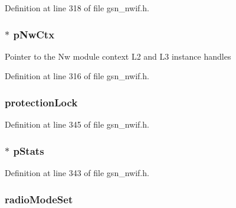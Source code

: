 Definition at line 318 of file gsn\_\-nwif.h.

\hypertarget{a00167_a4ab8e1b7273bd13fb04f9726ebf1d430}{
\subsubsection[{pNwCtx}]{$\ast$ {\bf pNwCtx}}}
\label{a00167_a4ab8e1b7273bd13fb04f9726ebf1d430}
Pointer to the Nw module context L2 and L3 instance handles 

Definition at line 316 of file gsn\_\-nwif.h.

\hypertarget{a00167_afb7d19983a90716b80a2f4dbfbf7b0c8}{
\subsubsection[{protectionLock}]{ {\bf protectionLock}}}
\label{a00167_afb7d19983a90716b80a2f4dbfbf7b0c8}


Definition at line 345 of file gsn\_\-nwif.h.

\hypertarget{a00167_aec0dbb062c1551edeb82d3a45c451e01}{
\subsubsection[{pStats}]{$\ast$ {\bf pStats}}}
\label{a00167_aec0dbb062c1551edeb82d3a45c451e01}


Definition at line 343 of file gsn\_\-nwif.h.

\hypertarget{a00167_a7e70681c41285d86fbe97d5ca157c9d1}{
\subsubsection[{radioModeSet}]{ {\bf radioModeSet}}}
\label{a00167_a7e70681c41285d86fbe97d5ca157c9d1}


